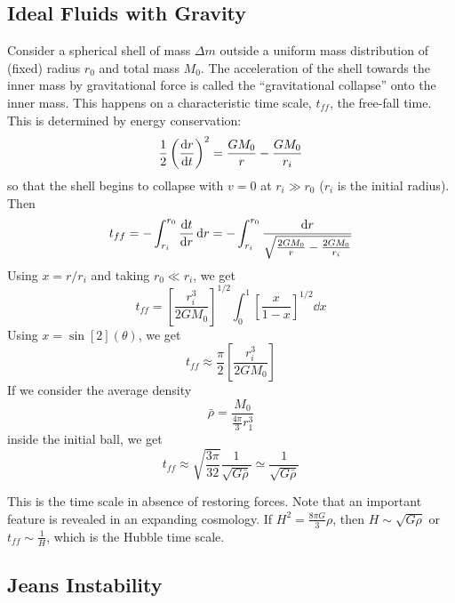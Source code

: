 \documentclass[a4paper,twoside,master.tex]{subfiles}
\begin{document}
\subsection{Ideal Fluids with Gravity}\label{sub:ideal_fluids_with_gravity}

Consider a spherical shell of mass $ \Delta m $ outside a uniform mass distribution of (fixed) radius $ r_0 $ and total mass $ M_0 $. The acceleration of the shell towards the inner mass by gravitational force is called the ``gravitational collapse'' onto the inner mass. This happens on a characteristic time scale, $ t_{ff} $, the free-fall time. This is determined by energy conservation:
\begin{equation}
    \frac{1}{2} \left( \dv{r}{t} \right)^2 = \frac{GM_0}{r} - \frac{G M_0}{r_i}
\end{equation}
so that the shell begins to collapse with $ v = 0 $ at $ r_i \gg r_0 $ ($ r_i $ is the initial radius). Then
\begin{equation}
    t_{ff} = - \int_{r_i}^{r_0} \dv{t}{r} \dd{r} = - \int_{r_i}^{r_0} \frac{\dd{r}}{\sqrt{\frac{2 G M_0}{r} - \frac{2 G M_0}{r_i}}}
\end{equation}
Using $ x = r/r_i $ and taking $ r_0 \ll r_i $, we get
\begin{equation}
    t_{ff} = \left[ \frac{r_i^3}{2GM_0} \right]^{1/2} \int_0^1 \left[ \frac{x}{1-x} \right]^{1/2} \dd{x}
\end{equation}
Using $ x = \sin[2](\theta) $, we get
\begin{equation}
    t_{ff} \approx \frac{\pi}{2} \left[ \frac{r_i^3}{2 GM_0} \right]
\end{equation}
If we consider the average density
\begin{equation}
    \bar{\rho} = \frac{M_0}{\frac{4 \pi}{3} r_1^3}
\end{equation}
inside the initial ball, we get
\begin{equation}
    t_{ff} \approx \sqrt{\frac{3 \pi}{32}} \frac{1}{\sqrt{G \bar{\rho}}} \simeq \frac{1}{\sqrt{G \bar{\rho}}} 
\end{equation}

This is the time scale in absence of restoring forces. Note that an important feature is revealed in an expanding cosmology. If $ H^2 = \frac{8 \pi G}{3} \rho $, then $ H \sim \sqrt{G \rho} $ or $ t_{ff} \sim \frac{1}{H} $, which is the Hubble time scale.

\subsection{Jeans Instability}\label{sub:jeans_instability}
\end{document}

